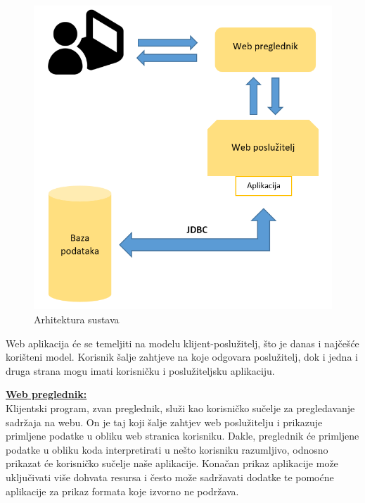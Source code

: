 		\begin{figure}[H]
					\includegraphics[scale=0.8]{arhitektura/arhitektura_sustava.png} %
					\centering
					\caption{Arhitektura sustava}
					\label{fig:arhitektura}
		\end{figure}

	\vspace{5mm} %

		Web aplikacija će se temeljiti na modelu klijent-poslužitelj, što je danas i najčešće korišteni model. Korisnik šalje zahtjeve na koje odgovara poslužitelj, dok i jedna i druga strana mogu imati korisničku i poslužiteljsku aplikaciju.

	\vspace{10mm} %

		\textbf{\underline{Web preglednik:} }\\

			Klijentski program, zvan preglednik, služi kao korisničko sučelje za pregledavanje sadržaja na webu. On je taj koji šalje zahtjev web poslužitelju i prikazuje primljene podatke u obliku web stranica korisniku. Dakle, preglednik će primljene podatke u obliku koda interpretirati u nešto korisniku razumljivo, odnosno prikazat će korisničko sučelje naše aplikacije. Konačan prikaz aplikacije može uključivati više dohvata resursa i često može sadržavati dodatke te pomoćne aplikacije za prikaz formata koje izvorno ne podržava.

